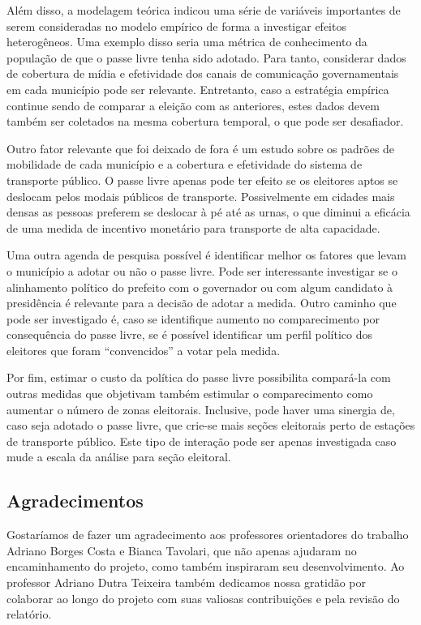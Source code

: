 Além disso, a modelagem teórica indicou uma série de variáveis importantes de serem consideradas no modelo empírico de forma a investigar efeitos heterogêneos. Uma exemplo disso seria uma métrica de conhecimento da população de que o passe livre tenha sido adotado. Para tanto, considerar dados de cobertura de mídia e efetividade dos canais de comunicação governamentais em cada município pode ser relevante. Entretanto, caso a estratégia empírica continue sendo de comparar a eleição com as anteriores, estes dados devem também ser coletados na mesma cobertura temporal, o que pode ser desafiador. 

Outro fator relevante que foi deixado de fora é um estudo sobre os padrões de mobilidade de cada município e a cobertura e efetividade do sistema de transporte público. O passe livre apenas pode ter efeito se os eleitores aptos se deslocam pelos modais públicos de transporte. Possivelmente em cidades mais densas as pessoas preferem se deslocar à pé até as urnas, o que diminui a eficácia de uma medida de incentivo monetário para transporte de alta capacidade.

Uma outra agenda de pesquisa possível é identificar melhor os fatores que levam o município a adotar ou não o passe livre. Pode ser interessante investigar se o alinhamento político do prefeito com o governador ou com algum candidato à presidência é relevante para a decisão de adotar a medida. Outro caminho que pode ser investigado é, caso se identifique aumento no comparecimento por consequência do passe livre, se é possível identificar um perfil político dos eleitores que foram ``convencidos'' a votar pela medida.

Por fim, estimar o custo da política do passe livre possibilita compará-la com outras medidas que objetivam também estimular o comparecimento como aumentar o número de zonas eleitorais. Inclusive, pode haver uma sinergia de, caso seja adotado o passe livre, que crie-se mais seções eleitorais perto de estações de transporte público. Este tipo de interação pode ser apenas investigada caso mude a escala da análise para seção eleitoral. 

\subsection{Agradecimentos}

Gostaríamos de fazer um agradecimento aos professores orientadores do trabalho Adriano Borges Costa e Bianca Tavolari, que não apenas ajudaram no encaminhamento do projeto, como também inspiraram seu desenvolvimento. Ao professor Adriano Dutra Teixeira também dedicamos nossa gratidão por colaborar ao longo do projeto com suas valiosas contribuições e pela revisão do relatório.

